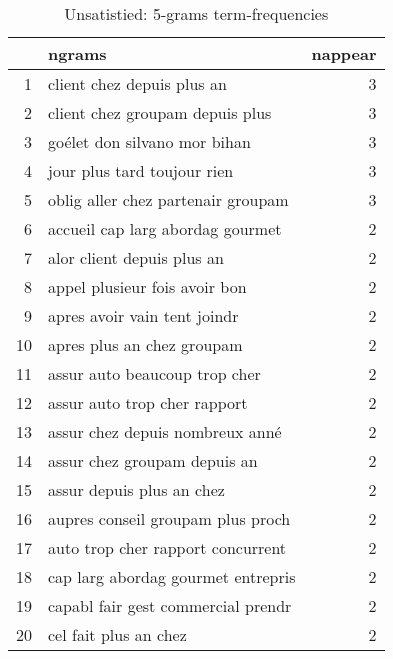 \begin{table}[ht]
\centering
\begin{tabular}{rlr}
  \hline
 & ngrams & nappear \\ 
  \hline
1 & client chez depuis plus an &   3 \\ 
  2 & client chez groupam depuis plus &   3 \\ 
  3 & goélet don silvano mor bihan &   3 \\ 
  4 & jour plus tard toujour rien &   3 \\ 
  5 & oblig aller chez partenair groupam &   3 \\ 
  6 & accueil cap larg abordag gourmet &   2 \\ 
  7 & alor client depuis plus an &   2 \\ 
  8 & appel plusieur fois avoir bon &   2 \\ 
  9 & apres avoir vain tent joindr &   2 \\ 
  10 & apres plus an chez groupam &   2 \\ 
  11 & assur auto beaucoup trop cher &   2 \\ 
  12 & assur auto trop cher rapport &   2 \\ 
  13 & assur chez depuis nombreux anné &   2 \\ 
  14 & assur chez groupam depuis an &   2 \\ 
  15 & assur depuis plus an chez &   2 \\ 
  16 & aupres conseil groupam plus proch &   2 \\ 
  17 & auto trop cher rapport concurrent &   2 \\ 
  18 & cap larg abordag gourmet entrepris &   2 \\ 
  19 & capabl fair gest commercial prendr &   2 \\ 
  20 & cel fait plus an chez &   2 \\ 
   \hline
\end{tabular}
\caption{Unsatistied: 5-grams term-frequencies} 
\label{tab:tf_inf_5}
\end{table}
